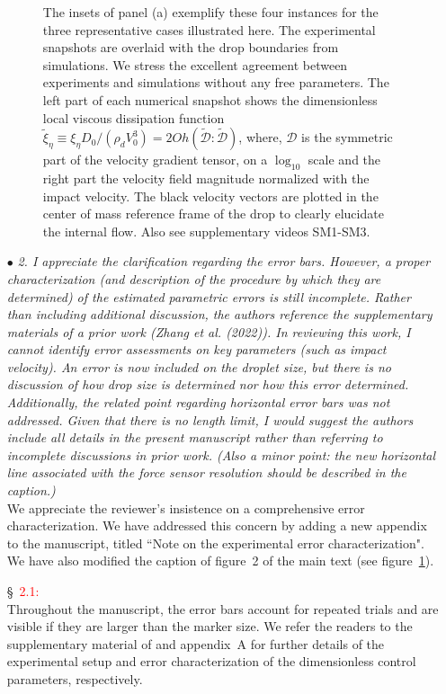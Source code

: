 \documentclass[]{article}
\newcommand*\red{\textcolor{red}}
\newcommand{\oo}{\color{magenta} \normalfont}
\newcommand{\bb}{\color{black} \normalfont}
\begin{document}
\begin{enumerate}
\begin{figure}
{{				The insets of panel (a) exemplify these four instances for the three representative cases illustrated here. The experimental snapshots are overlaid with the drop boundaries from simulations. 
				We stress the excellent agreement between experiments and simulations without any free parameters.
				The left part of each numerical snapshot shows the dimensionless local viscous dissipation function $\tilde{\xi}_\eta \equiv \xi_\eta D_0/\left(\rho_dV_0^3\right) = 2Oh\left(\boldsymbol{\tilde{\mathcal{D}}:\tilde{\mathcal{D}}}\right)$, where, $\boldsymbol{\mathcal{D}}$ is the symmetric part of the velocity gradient tensor, on a $\log_{10}$ scale and the right part the velocity field magnitude normalized with the impact velocity. The black velocity vectors are plotted in the center of mass reference frame of the drop to clearly elucidate the internal flow. Also see supplementary videos SM1-SM3.\bb}}
		\label{fig:summary}
	\end{figure}
	
	
	
	\item[$\bullet$] \textit{2. I appreciate the clarification regarding the error bars. However, a proper characterization (and description of the procedure by which they are determined) of the estimated parametric errors is still incomplete. Rather than including additional discussion, the authors reference the supplementary materials of a prior work (Zhang et al. (2022)). In reviewing this work, I cannot identify error assessments on key parameters (such as impact velocity). An error is now included on the droplet size, but there is no discussion of how drop size is determined nor how this error determined. Additionally, the related point regarding horizontal error bars was not addressed. Given that there is no length limit, I would suggest the authors include all details in the present manuscript rather than referring to incomplete discussions in prior work. (Also a minor point: the new horizontal line associated with the force sensor resolution should be described in the caption.)}\\[1mm]
	
	We appreciate the reviewer's insistence on a comprehensive error characterization. We have addressed this concern by adding a new appendix to the manuscript, titled ``Note on the experimental error characterization". We have also modified the caption of figure~2 of the main text (see figure~\ref{fig:summary}).  
	
	\S~\red{2.1:}\\
	\oo
	Throughout the manuscript, the error bars account for repeated trials and are visible if they are larger than the marker size. We refer the readers to the supplementary material of \citet{zhang2022impact}  and appendix~A for further details of the experimental setup and error characterization of the dimensionless control parameters, respectively.
	

\end{enumerate}
\end{document}
